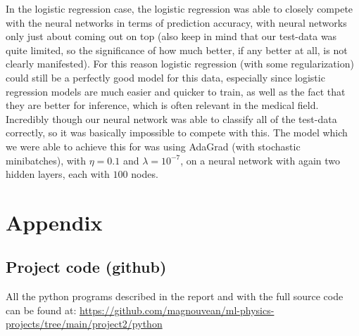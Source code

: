 \documentclass{article}
\begin{document}
In the logistic regression case, the logistic regression was able to
closely compete with the neural networks in terms of prediction accuracy, with
neural networks only just about coming out on top (also keep in mind that our
test-data was quite limited, so the significance of how much better, if any
better at all, is not clearly manifested). For this reason logistic regression
(with some regularization) could still be a perfectly good model for this data,
especially since logistic regression models are much easier and quicker to
train, as well as the fact that they are better for inference, which is often
relevant in the medical field. Incredibly though our neural network was able to
classify all of the test-data correctly, so it was basically impossible to
compete with this. The model which we were able to achieve this for was using
AdaGrad (with stochastic minibatches), with $\eta = 0.1$ and $\lambda =
      10^{-7}$, on a neural network with again two hidden layers, each with $100$
nodes.

\section{Appendix}

\subsection{Project code (github)}
All the python programs described in the report and with the full source code can be
found at:
\url{https://github.com/magnouvean/ml-physics-projects/tree/main/project2/python}


\end{document}
